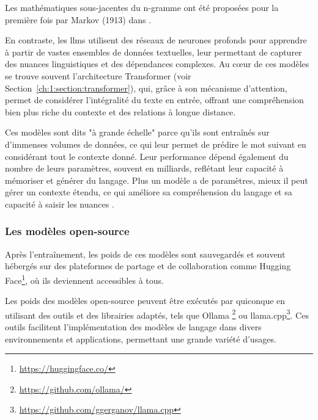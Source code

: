 Les mathématiques sous-jacentes du n-gramme ont été proposées pour la première fois par Markov (1913) dans \cite{Markov}.

En contraste, les \acfp{llm} utilisent des réseaux de neurones profonds pour apprendre à partir de vastes ensembles de données textuelles, leur permettant de capturer des nuances linguistiques et des dépendances complexes. Au cœur de ces modèles se trouve souvent l'architecture Transformer (voir Section~\ref{ch:1:section:transformer}), qui, grâce à son mécanisme d'attention, permet de considérer l'intégralité du texte en entrée, offrant une compréhension bien plus riche du contexte et des relations à longue distance.

Ces modèles sont dits "à grande échelle" parce qu'ils sont entraînés sur d'immenses volumes de données, ce qui leur permet de prédire le mot suivant en considérant tout le contexte donné. Leur performance dépend également du nombre de leurs paramètres, souvent en milliards, reflétant leur capacité à mémoriser et générer du langage. Plus un modèle a de paramètres, mieux il peut gérer un contexte étendu, ce qui améliore sa compréhension du langage et sa capacité à saisir les nuances \cite{Caelen_Blete_2023}.

\subsubsection{Les modèles open-source}

Après l'entraînement, les poids de ces modèles sont sauvegardés et souvent hébergés sur des plateformes de partage et de collaboration comme Hugging Face\footnote{\href{https://huggingface.co/}{https://huggingface.co/}}, où ils deviennent accessibles à tous.

Les poids des modèles open-source peuvent être exécutés par quiconque en utilisant des outils et des librairies adaptés, tels que Ollama \footnote{\href{https://github.com/ollama/}{https://github.com/ollama/}} ou llama.cpp\footnote{\href{https://github.com/ggerganov/llama.cpp}{https://github.com/ggerganov/llama.cpp}}. Ces outils facilitent l'implémentation des modèles de langage dans divers environnements et applications, permettant une grande variété d'usages.

